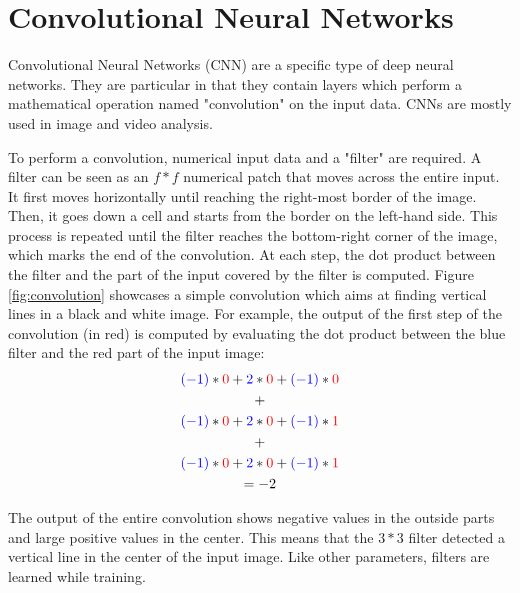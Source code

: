 \section{Convolutional Neural Networks}

\setlength{\marginparwidth}{3cm}\leavevmode {}Convolutional Neural Networks (CNN) are a specific type of deep neural networks. They are particular in that they contain layers which perform a mathematical operation named "convolution" on the input data. CNNs are mostly used in image and video analysis.

To perform a convolution, numerical input data and a "filter" are required. A filter can be seen as an $f*f$ numerical patch that moves across the entire input. It first moves horizontally until reaching the right-most border of the image. Then, it goes down a cell and starts from the border on the left-hand side. This process is repeated until the filter reaches the bottom-right corner of the image, which marks the end of the convolution. At each step, the dot product between the filter and the part of the input covered by the filter is computed. Figure \ref{fig:convolution} showcases a simple convolution which aims at finding vertical lines in a black and white image. For example, the output of the first step of the convolution (in red) is computed by evaluating the dot product between the blue filter and the red part of the input image: 
\begin{equation}
\begin{gathered}
\color{blue}(-1) \color{black}* \color{red}0 \color{black}+ \color{blue}2 \color{black}* \color{red}0 \color{black}+ \color{blue}(-1) \color{black}* \color{red}0
\\ \color{black}+ \\ 
\color{blue}(-1) \color{black}* \color{red}0 \color{black}+ \color{blue}2 \color{black}* \color{red}0 \color{black}+ \color{blue}(-1) \color{black}* \color{red}1 
\\ \color{black}+ \\ 
\color{blue}(-1) \color{black}* \color{red}0 \color{black}+ \color{blue}2 \color{black}* \color{red}0 \color{black}+ \color{blue}(-1) \color{black}* \color{red}1 
\\ \color{black}= -2
\end{gathered}
\end{equation}

\noindent The output of the entire convolution shows negative values in the outside parts and large positive values in the center. This means that the $3*3$ filter detected a vertical line in the center of the input image. Like other parameters, filters are learned while training. 

